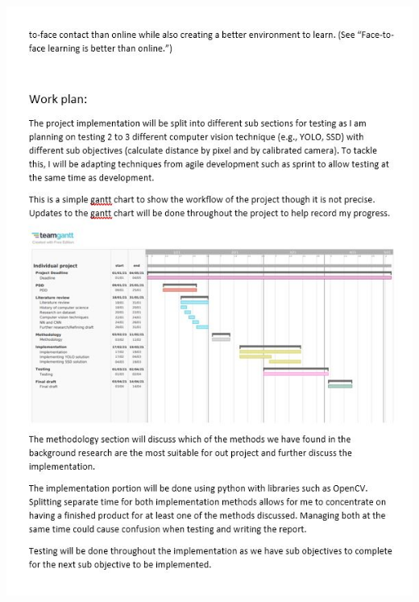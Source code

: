 \documentclass[12pt]{report}
\begin{document}
\includegraphics[width=160mm]{./images/appendix/PDD3.JPG}
\end{document}
